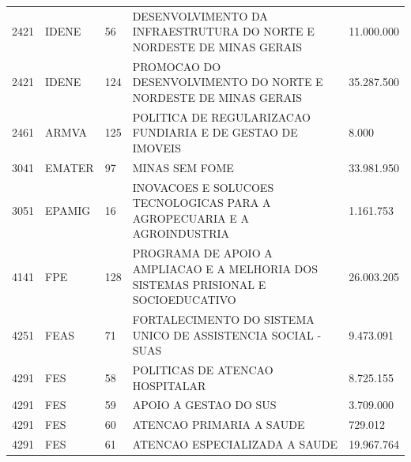 \documentclass{article}
\begin{document}
\begin{longtable}[c]{m{1cm}|m{1.5cm}|m{1cm}m{10cm}|m{2cm}}
\multicolumn{1}{C{1cm}|}{2421} & \multicolumn{1}{L{1.5cm}|}{IDENE} & \multicolumn{1}{C{1cm}|}{56} & \multicolumn{1}{L{10cm}|}{DESENVOLVIMENTO DA INFRAESTRUTURA DO NORTE E NORDESTE DE MINAS GERAIS} & \multicolumn{1}{R{2cm}}{11.000.000} \\
\multicolumn{1}{C{1cm}|}{2421} & \multicolumn{1}{L{1.5cm}|}{IDENE} & \multicolumn{1}{C{1cm}|}{124} & \multicolumn{1}{L{10cm}|}{PROMOCAO DO DESENVOLVIMENTO DO NORTE E NORDESTE DE MINAS GERAIS} & \multicolumn{1}{R{2cm}}{35.287.500} \\
\multicolumn{1}{C{1cm}|}{2461} & \multicolumn{1}{L{1.5cm}|}{ARMVA} & \multicolumn{1}{C{1cm}|}{125} & \multicolumn{1}{L{10cm}|}{POLITICA DE REGULARIZACAO FUNDIARIA E DE GESTAO DE IMOVEIS} & \multicolumn{1}{R{2cm}}{8.000} \\
\multicolumn{1}{C{1cm}|}{3041} & \multicolumn{1}{L{1.5cm}|}{EMATER} & \multicolumn{1}{C{1cm}|}{97} & \multicolumn{1}{L{10cm}|}{MINAS SEM FOME} & \multicolumn{1}{R{2cm}}{33.981.950} \\
\multicolumn{1}{C{1cm}|}{3051} & \multicolumn{1}{L{1.5cm}|}{EPAMIG} & \multicolumn{1}{C{1cm}|}{16} & \multicolumn{1}{L{10cm}|}{INOVACOES E SOLUCOES TECNOLOGICAS PARA A AGROPECUARIA E A AGROINDUSTRIA} & \multicolumn{1}{R{2cm}}{1.161.753} \\
\multicolumn{1}{C{1cm}|}{4141} & \multicolumn{1}{L{1.5cm}|}{FPE} & \multicolumn{1}{C{1cm}|}{128} & \multicolumn{1}{L{10cm}|}{PROGRAMA DE APOIO A AMPLIACAO E A MELHORIA DOS SISTEMAS PRISIONAL E SOCIOEDUCATIVO} & \multicolumn{1}{R{2cm}}{26.003.205} \\
\multicolumn{1}{C{1cm}|}{4251} & \multicolumn{1}{L{1.5cm}|}{FEAS} & \multicolumn{1}{C{1cm}|}{71} & \multicolumn{1}{L{10cm}|}{FORTALECIMENTO DO SISTEMA UNICO DE ASSISTENCIA SOCIAL - SUAS} & \multicolumn{1}{R{2cm}}{9.473.091} \\
\multicolumn{1}{C{1cm}|}{4291} & \multicolumn{1}{L{1.5cm}|}{FES} & \multicolumn{1}{C{1cm}|}{58} & \multicolumn{1}{L{10cm}|}{POLITICAS DE ATENCAO HOSPITALAR} & \multicolumn{1}{R{2cm}}{8.725.155} \\
\multicolumn{1}{C{1cm}|}{4291} & \multicolumn{1}{L{1.5cm}|}{FES} & \multicolumn{1}{C{1cm}|}{59} & \multicolumn{1}{L{10cm}|}{APOIO A GESTAO DO SUS} & \multicolumn{1}{R{2cm}}{3.709.000} \\
\multicolumn{1}{C{1cm}|}{4291} & \multicolumn{1}{L{1.5cm}|}{FES} & \multicolumn{1}{C{1cm}|}{60} & \multicolumn{1}{L{10cm}|}{ATENCAO PRIMARIA A SAUDE} & \multicolumn{1}{R{2cm}}{729.012} \\
\multicolumn{1}{C{1cm}|}{4291} & \multicolumn{1}{L{1.5cm}|}{FES} & \multicolumn{1}{C{1cm}|}{61} & \multicolumn{1}{L{10cm}|}{ATENCAO ESPECIALIZADA A SAUDE} & \multicolumn{1}{R{2cm}}{19.967.764} \\

\end{longtable}
\end{document}
